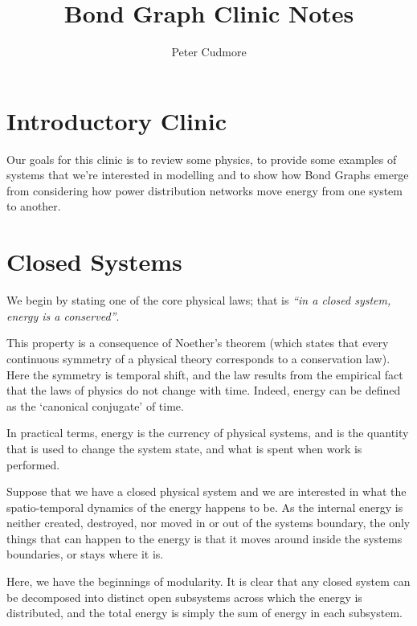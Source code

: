 \documentclass[11pt, a4paper]{amsart}
\title{Bond Graph Clinic Notes}
\author{Peter Cudmore}
\begin{document}
\maketitle

\section{Introductory Clinic}
Our goals for this clinic is to review some physics, to provide some examples of systems that we're interested in modelling and to
show how Bond Graphs emerge from considering how power distribution networks move energy from one system to another.

\section{Closed Systems}
We begin by stating one of the core physical laws; that is \emph{``in a closed system, energy is a conserved''}.

This property is a consequence of Noether's theorem (which states that every continuous symmetry of a physical theory corresponds to a conservation law). Here the symmetry is temporal shift, and the law results from the empirical fact that the laws of physics do not change with time. Indeed, energy can be defined as the `canonical conjugate' of time.

In practical terms, energy is the currency of physical systems, and is the quantity that is used to change the system state, and what is spent when work is performed. 

Suppose that we have a closed physical system and we are interested in what the spatio-temporal dynamics of the energy happens to be.
As the internal energy is neither created, destroyed, nor moved in or out of the systems boundary, the only things that can happen to the energy is that it moves around inside the systems boundaries, or stays where it is.

Here, we have the beginnings of modularity. It is clear that any closed system can be decomposed into distinct open subsystems across which the energy is distributed, and the total energy is simply the sum of energy in each subsystem.
\end{document}
